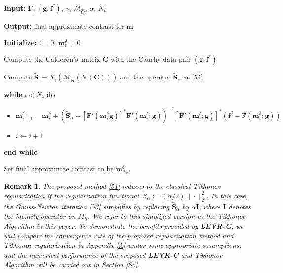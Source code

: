 \documentclass[11pt]{article}
\newcommand{\wit}{\widetilde}
\newcommand{\Calderon}{Calder\'{o}n}
\newcommand{\bds}[1]{\boldsymbol{#1}}
\newtheorem{remark}{Remark}[section]
\begin{document}
\begin{algorithm}[htbp]
\caption{Learning-enhanced variational regularization via \Calderon's method (\textbf{LEVR-C})}\label{V}

\textbf{Input: }$\bds{F}$, $ (\bds{g}, \bds{f}^\delta) $, $\gamma$, $ \mathcal{M}_{\widehat{\Theta}} $, $\alpha$, $ N_v $

\textbf{Output:} final approximate contrast for $ \bds{m} $

\textbf{Initialize:} $ i = 0 $, $ \bds{m}_0^\delta = 0 $

\begin{algorithmic}[1]
\item Compute the \Calderon's matrix $ \bds{C} $ with the Cauchy data pair $ (\bds{g}, \bds{f}^\delta) $
\item Compute $ \widetilde{\bds{S}} := \mathcal{S}_\gamma(\mathcal{M}_{\widehat{\Theta}}(\mathcal{N}(\bds{C}))) $ and the operator $ \widetilde{\bds{S}}_\alpha $ as \eqref{54}
\item \textbf{while} $ i<N_v  $ \textbf{do}
\item \begin{itemize}
\item[]  $ \bds{m}^\delta_{i+1} =\bds{m}^\delta_i + \left(\wit{\bds{S}}_\alpha + \left[\bds{F}'(\bds{m}^\delta_i \bds{g})\right]^*\bds{F}'(\bds{m}^\delta_i; \bds{g}) \right)^{-1}\left[\bds{F}'(\bds{m}^\delta_i; \bds{g})\right]^*\left(\bds{f}^\delta - \bds{F}(\bds{m}^\delta_i; \bds{g})\right) $
\end{itemize}
\item \begin{itemize}
\item[]  $ i\gets i+1 $	
\end{itemize} 
\item \textbf{end while}
\item Set final approximate contrast to be $\bds{m}_{N_v}^\delta$.
\end{algorithmic}
\end{algorithm}

\begin{remark}\label{R2}\rm
The proposed method \eqref{51} reduces to the classical Tikhonov regularization if the regularization functional $ \mathcal{R}_\alpha := (\alpha/2)\|\cdot\|^2_2 $.
In this case, the Gauss-Newton iteration \eqref{53} simplifies by replacing $ \wit{\bds{S}}_\alpha $ by $ \alpha\bds{I} $, where $ \bds{I} $ denotes the identity operator on $ M_h $.
We refer to this simplified version as the \textit{Tikhonov Algorithm} in this paper. 
To demonstrate the benefits provided by \textbf{LEVR-C}, we will compare the convergence rate of the proposed regularization method and Tikhonov regularization in Appendix \ref{A} under some appropriate assumptions, and the numerical performance of the proposed \textbf{LEVR-C} and \textit{Tikhonov Algorithm} will be carried out in Section \ref{S5}.
\end{remark}
\end{document}
